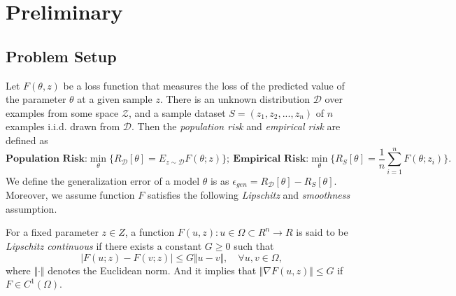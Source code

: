 \section{Preliminary}

\subsection{Problem Setup}

Let $F(\theta, z)$ be a loss function that measures the loss of the predicted value of the parameter $\theta$ at a given sample $z$. There is an unknown distribution $\mathcal{D}$ over examples from some space $\mathcal{Z}$, and a sample dataset $S=(z_1, z_2,..., z_n)$ of $n$ examples i.i.d. drawn from $\mathcal{D}$. Then the \emph{population risk} and \emph{empirical risk} are defined as 
\begin{equation*}
\textbf{Population Risk:}  \min_\theta \{R_\mathcal{D}[\theta]=E_ {z \sim \mathcal{D}}F(\theta; z) \}; \ 
\textbf{Empirical Risk:}  \min_\theta \{ R_S [\theta]= \frac{1}{n} \sum_{i=1}^{n}F(\theta; z_i) \}.
\end{equation*}
 We define the generalization error of a model $\theta$ is as $\epsilon_{gen}=R_\mathcal{D}[\theta] - R_S [\theta]$. 
 Moreover, we assume function $F$ satisfies the following \emph{Lipschitz} and \emph{smoothness} assumption.

\begin{definition}[Lipschitz]
For a fixed parameter $z\in Z$, a function $F(u,z):u\in\Omega \subset R^n \rightarrow R$ is said to be \textit{Lipschitz continuous} if there exists a constant $G\geq 0$ such that 
    \begin{equation}\label{eq:l-lipschitz}
     \vert F(u;z)-F(v;z)\vert \leq G\Vert u-v\Vert,\quad \forall u, v \in \Omega,
    \end{equation}
where $\Vert\cdot\Vert$ denotes the Euclidean norm. And it implies that $\Vert\nabla F(u,z)\Vert \leq G$ if $F\in C^1(\Omega)$. %
\end{definition}

